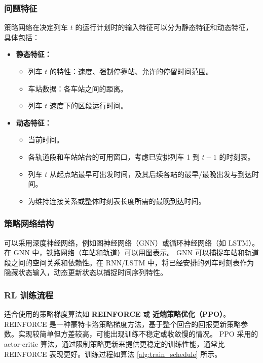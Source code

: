 \documentclass{article}
\begin{document}
\subsubsection{问题特征}
策略网络在决定列车 $t$ 的运行计划时的输入特征可以分为静态特征和动态特征，具体包括：
\begin{itemize}
    \item \textbf{静态特征：}
        \begin{itemize}
            \item 列车 $t$ 的特性：速度、强制停靠站、允许的停留时间范围。
            \item 车站数据：各车站之间的距离。
            \item 列车 $t$ 速度下的区段运行时间。
        \end{itemize}
    \item \textbf{动态特征：}
        \begin{itemize}
            \item 当前时间。
            \item 各轨道段和车站站台的可用窗口，考虑已安排列车 1 到 $t-1$ 的时刻表。
            \item 列车 $t$ 从起点站最早可出发时间，及其后续各站的最早/最晚出发与到达时间。
            \item 为维持连接关系或整体时刻表长度所需的最晚到达时间。
        \end{itemize}
\end{itemize}

\subsubsection{策略网络结构}
可以采用深度神经网络，例如图神经网络（GNN）或循环神经网络（如 LSTM）。在 GNN 中，铁路网络（车站和轨道）可以用图表示。
GNN 可以捕捉车站和轨道段之间的空间关系和依赖性。在 RNN/LSTM 中，将已经安排的列车时刻表作为隐藏状态输入，动态更新状态以捕捉时间序列特性。

\subsubsection{RL 训练流程}
适合使用的策略梯度算法如 \textbf{REINFORCE} 或 \textbf{近端策略优化（PPO）}。
REINFORCE 是一种蒙特卡洛策略梯度方法，基于整个回合的回报更新策略参数。实现较简单但方差较高，可能出现训练不稳定或收敛慢的情况。
PPO 采用的 actor-critic 算法，通过限制策略更新来提供更稳定的训练性能，通常比 REINFORCE
表现更好。训练过程如算法 \ref{alg:train_schedule} 所示。
\end{document}
